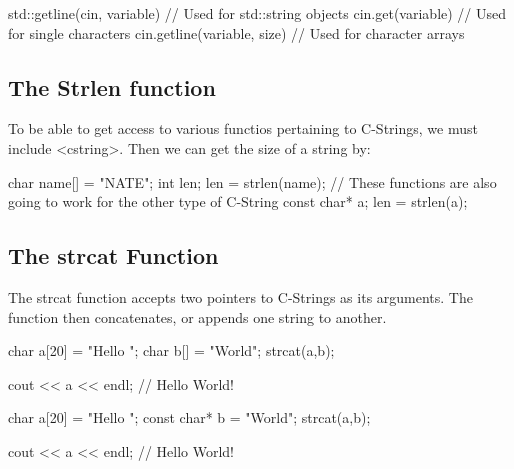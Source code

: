 \documentclass{report}
\begin{document}
    \begin{cppcode}
        std::getline(cin, variable) // Used for std::string objects
        cin.get(variable) // Used for single characters
        cin.getline(variable, size) // Used for character arrays
    \end{cppcode}

    \bigbreak \noindent 

    \bigbreak \noindent 
    \subsection{The Strlen function}
    \bigbreak \noindent 
    To be able to get access to various functios pertaining to C-Strings, we must include <cstring>. Then we can get the size of a string by:
    \bigbreak \noindent 

    \begin{cppcode}
        char name[] = "NATE";
        int len;
        len = strlen(name);
        // These functions are also going to work for the other type of C-String
        const char* a;
        len = strlen(a);
    \end{cppcode}

    \bigbreak \noindent 


    \pagebreak
    \subsection{The strcat Function}
    \bigbreak \noindent 
    The strcat function accepts two pointers to C-Strings as its arguments. The function then concatenates, or appends one string to another.
    \bigbreak \noindent 

    \begin{cppcode}
        char a[20] = "Hello ";
        char b[] = "World";
        strcat(a,b);

        cout << a << endl; // Hello World!

        char a[20] = "Hello ";
        const char* b = "World";
        strcat(a,b);

        cout << a << endl; // Hello World!
    \end{cppcode}

    \bigbreak \noindent 
\end{document}
